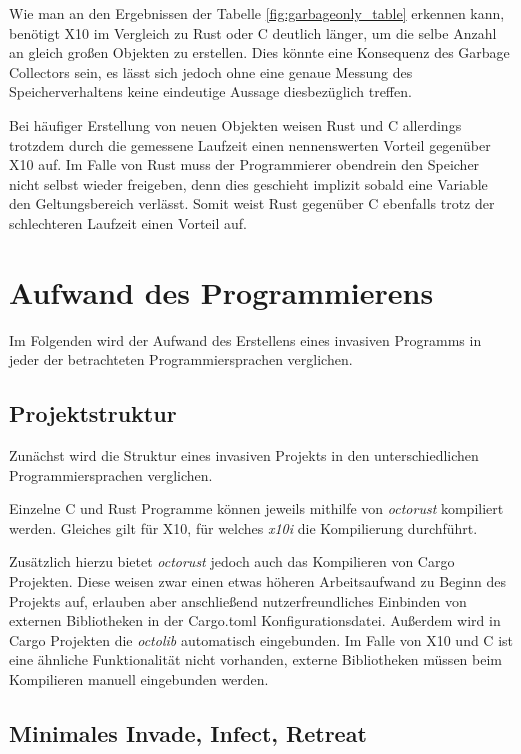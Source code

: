 Wie man an den Ergebnissen der Tabelle \ref{fig:garbageonly_table} erkennen kann,
benötigt X10 im Vergleich zu Rust oder C deutlich länger, um die selbe Anzahl an gleich großen Objekten zu erstellen. 
Dies könnte eine Konsequenz des Garbage Collectors sein, es lässt sich jedoch ohne eine genaue Messung des
Speicherverhaltens keine eindeutige Aussage diesbezüglich treffen.

Bei häufiger Erstellung von neuen Objekten weisen Rust und C allerdings trotzdem durch die gemessene Laufzeit
einen nennenswerten Vorteil gegenüber X10 auf. Im Falle von Rust muss der Programmierer obendrein
den Speicher nicht selbst wieder freigeben, denn dies geschieht implizit sobald eine Variable
den Geltungsbereich verlässt. Somit weist Rust gegenüber C ebenfalls trotz der schlechteren Laufzeit
einen Vorteil auf.

\section{Aufwand des Programmierens}

Im Folgenden wird der Aufwand des Erstellens eines invasiven Programms in jeder der betrachteten
Programmiersprachen verglichen.

\subsection{Projektstruktur}

Zunächst wird die Struktur eines invasiven Projekts in den unterschiedlichen Programmiersprachen verglichen.

Einzelne C und Rust Programme können jeweils mithilfe von \textit{octorust} kompiliert werden.
Gleiches gilt für X10, für welches \textit{x10i} die Kompilierung durchführt.

Zusätzlich hierzu bietet \textit{octorust} jedoch auch das Kompilieren von Cargo Projekten.
Diese weisen zwar einen etwas
höheren Arbeitsaufwand zu Beginn des Projekts auf, erlauben aber anschließend nutzerfreundliches Einbinden von
externen Bibliotheken in der Cargo.toml Konfigurationsdatei. Außerdem wird in Cargo Projekten
die \textit{octolib} automatisch eingebunden. Im Falle von X10 und C ist eine ähnliche
Funktionalität nicht vorhanden, externe Bibliotheken müssen beim Kompilieren manuell eingebunden werden.

\subsection{Minimales Invade, Infect, Retreat}

